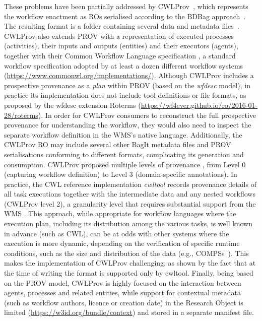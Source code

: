 \documentclass[10pt,letterpaper]{article}
\begin{document}
These problems have been partially addressed by CWLProv~\cite{Khan 2019}, which represents the workflow enactment as ROs serialised according to the BDBag approach~\cite{Chard 2016}.
The resulting format is a folder containing several data and metadata files~\cite{Soiland-Reyes 2018}.
CWLProv also extends PROV with a representation of executed processes (activities), their inputs and outputs (entities) and their executors (agents), together with their Common Workflow Language specification
\cite{Crusoe 2022}, a standard workflow specification adopted by at least a dozen different workflow systems (\url{https://www.commonwl.org/implementations/}). Although CWLProv includes a prospective provenance as a \emph{plan}
within PROV (based on the \emph{wfdesc} model), in practice its implementation does not include tool definitions or file formats, as proposed by the wfdesc extension Roterms (\url{https://wf4ever.github.io/ro/2016-01-28/roterms}).
In order for CWLProv consumers to reconstruct the full prospective provenance for understanding the workflow, they would also need to inspect the separate workflow definition in the WMS's native language.
Additionally, the CWLProv RO may include several other BagIt metadata files and PROV serialisations conforming to different formats, complicating its generation and consumption.
CWLProv proposed multiple levels of provenance \cite[figure 2]{Khan 2019}, from Level 0 (capturing workflow definition) to Level 3 (domain-specific annotations). 
In practice, the CWL reference implementation \emph{cwltool} \cite{Amstutz 2023} records provenance details of all task executions together with the intermediate data and any nested workflows (CWLProv level 2), a granularity level that requires substantial support from the WMS
\cite{Soiland-Reyes 2022a}.
This approach, while appropriate for workflow languages where the execution plan, including its distribution among the various tasks, is well known in advance (such as CWL), can be at odds with other systems where the execution is more dynamic, depending on the verification of specific runtime conditions, such as the size and distribution of the data (e.g., COMPSs~\cite{Lordan 2014}).
This makes the implementation of CWLProv challenging, as shown by the fact that at the time of writing the format is supported only by cwltool.
Finally, being based on the PROV model, CWLProv is highly focused on the interaction between agents, processes and related entities, while support for contextual metadata (such as workflow authors, licence or creation date) in the Research Object is limited (\url{https://w3id.org/bundle/context}) and stored in a separate manifest file.
\end{document}
